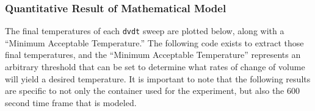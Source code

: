 \documentclass[11pt]{article}
\begin{document}
    \hypertarget{quantitative-result-of-mathematical-model}{%
\subsubsection{Quantitative Result of Mathematical
Model}\label{quantitative-result-of-mathematical-model}}

The final temperatures of each \texttt{dvdt} sweep are plotted below,
along with a ``Minimum Acceptable Temperature.'' The following code
exists to extract those final temperatures, and the ``Minimum Acceptable
Temperature'' represents an arbitrary threshold that can be set to
determine what rates of change of volume will yield a desired
temperature. It is important to note that the following results are
specific to not only the container used for the experiment, but also the
600 second time frame that is modeled.
\end{document}
